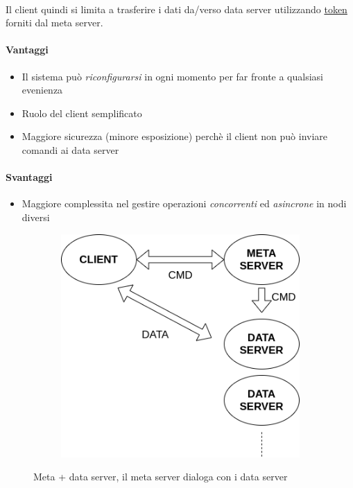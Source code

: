 \documentclass{article}
\begin{document}
\paragraph{} Il client quindi si limita a trasferire i dati da/verso data server utilizzando \underline{token} forniti dal meta server. 

\paragraph{Vantaggi} \begin{itemize}
	\item Il sistema può \emph{riconfigurarsi} in ogni momento per far fronte a qualsiasi evenienza
	\item Ruolo del client semplificato 
	\item Maggiore sicurezza (minore esposizione) perchè il client non può inviare comandi ai data server
\end{itemize}


\paragraph{Svantaggi} \begin{itemize}
	\item Maggiore complessita nel gestire operazioni \emph{concorrenti} ed \emph{asincrone} in nodi diversi
\end{itemize}

\begin{figure}[H]
	\centering
	\begin{subfigure}{0.60\linewidth}
		\includegraphics[width=\linewidth]{../diagrams/architettura/6.png}
	\end{subfigure}
	\caption{Meta + data server, il meta server dialoga con i data server}
\end{figure}
\end{document}
